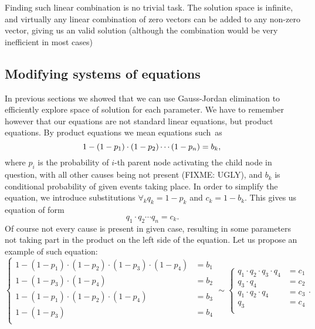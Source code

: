 Finding such linear combination is no trivial task.
The solution space is infinite, and virtually any linear combination of zero vectors can be added to any non-zero vector, giving us an valid solution (although the combination would be very inefficient in most cases)

\subsection{Modifying systems of equations}
In previous sections we showed that we can use Gauss-Jordan elimination to efficiently explore space of solution for each parameter.
We have to remember however that our equations are not standard linear equations, but product equations.
By product equations we mean equations such~as
\begin{equation}
    1 - (1-p_1)\cdot(1-p_2) \cdots (1-p_n) = b_k,\\
\end{equation}
where $p_i$ is the probability of $i$-th parent node activating the child node in question, with all other causes being not present (FIXME: UGLY), and $b_k$ is conditional probability of given events taking place.
In order to simplify the equation, we introduce substitutions $\forall_kq_k = 1 - p_k$ and $c_k = 1 - b_k$.
This gives us equation of form
\begin{equation}
    q_1 \cdot q_2 \cdots q_n = c_k.
\end{equation}
Of course not every cause is present in given case, resulting in some parameters not taking part in the product on the left side of the equation.
Let us propose an example of such equation:
\begin{equation}
\begin{cases}
    1 - (1-p_1) \cdot (1-p_2) \cdot (1-p_3) \cdot (1-p_4) &= b_1\\
    1 - (1-p_3) \cdot (1-p_4) & = b_2\\
    1 - (1-p_1) \cdot (1-p_2) \cdot (1-p_4) & = b_3\\
    1 - (1-p_3) & = b_4\\
\end{cases}
\sim
\begin{cases}
    q_1 \cdot q_2 \cdot q_3 \cdot q_4 &= c_1\\
    q_3 \cdot q_4 &= c_2\\
    q_1 \cdot q_2 \cdot q_4 &= c_3\\
    q_3 &= c_4\\
\end{cases}.
\end{equation}

